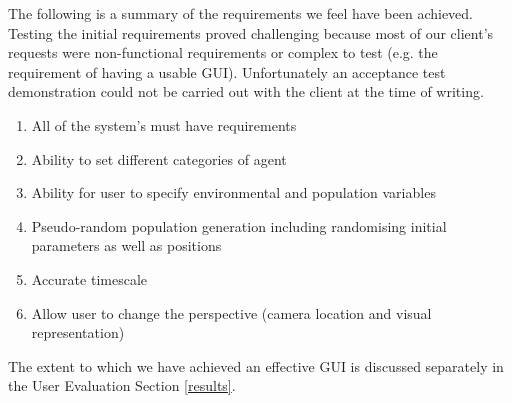 The following is a summary of the requirements we feel have been achieved. Testing the initial requirements proved challenging because most of our client's requests were non-functional requirements or complex to test (e.g. the requirement of having a usable GUI). Unfortunately an acceptance test demonstration could not be carried out with the client at the time of writing.

\begin{enumerate}
\item{All of the system's must have requirements}
\item{Ability to set different categories of agent}
\item{Ability for user to specify environmental and population variables}
\item{Pseudo-random population generation including randomising initial parameters as well as positions}
\item{Accurate timescale}
\item{Allow user to change the perspective (camera location and visual representation)}
\end{enumerate}

The extent to which we have achieved an effective GUI is discussed separately in the User Evaluation Section \ref{results}. 

